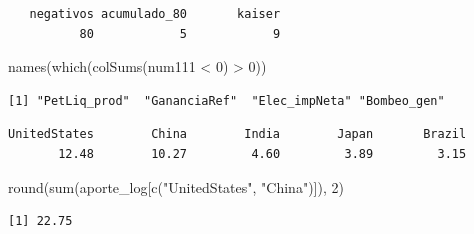 \documentclass[oneside, openany, fontset=libertinus]{mitthesis}
\newenvironment{Shaded}{\begin{snugshade}}{\end{snugshade}}
\newcommand{\AttributeTok}[1]{\textcolor[rgb]{0.40,0.45,0.13}{#1}}
\newcommand{\ConstantTok}[1]{\textcolor[rgb]{0.56,0.35,0.01}{#1}}
\newcommand{\DecValTok}[1]{\textcolor[rgb]{0.68,0.00,0.00}{#1}}
\newcommand{\FunctionTok}[1]{\textcolor[rgb]{0.28,0.35,0.67}{#1}}
\newcommand{\NormalTok}[1]{\textcolor[rgb]{0.00,0.23,0.31}{#1}}
\newcommand{\OtherTok}[1]{\textcolor[rgb]{0.00,0.23,0.31}{#1}}
\newcommand{\SpecialCharTok}[1]{\textcolor[rgb]{0.37,0.37,0.37}{#1}}
\newcommand{\StringTok}[1]{\textcolor[rgb]{0.13,0.47,0.30}{#1}}
\begin{document}
\begin{verbatim}
   negativos acumulado_80       kaiser 
          80            5            9 
\end{verbatim}

\Needspace{0.38in}

\begin{Shaded}
\begin{Highlighting}[]
\FunctionTok{names}\NormalTok{(}\FunctionTok{which}\NormalTok{(}\FunctionTok{colSums}\NormalTok{(num111 }\SpecialCharTok{\textless{}} \DecValTok{0}\NormalTok{) }\SpecialCharTok{\textgreater{}} \DecValTok{0}\NormalTok{))}
\end{Highlighting}
\end{Shaded}

\begin{verbatim}
[1] "PetLiq_prod"  "GananciaRef"  "Elec_impNeta" "Bombeo_gen"  
\end{verbatim}

\Needspace{0.76in}

\begin{Shaded}
\end{Shaded}

\begin{verbatim}
UnitedStates        China        India        Japan       Brazil 
       12.48        10.27         4.60         3.89         3.15 
\end{verbatim}

\Needspace{0.38in}

\begin{Shaded}
\begin{Highlighting}[]
\FunctionTok{round}\NormalTok{(}\FunctionTok{sum}\NormalTok{(aporte\_log[}\FunctionTok{c}\NormalTok{(}\StringTok{"UnitedStates"}\NormalTok{, }\StringTok{"China"}\NormalTok{)]), }\DecValTok{2}\NormalTok{)}
\end{Highlighting}
\end{Shaded}

\begin{verbatim}
[1] 22.75
\end{verbatim}
\end{document}

